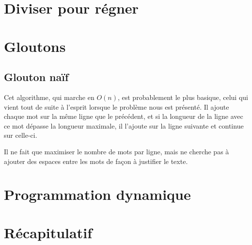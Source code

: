 \documentclass{article}
\begin{document}
\section{Diviser pour régner}

\section{Gloutons}

\subsection{Glouton naïf}

Cet algorithme, qui marche en $O(n)$, est probablement le plus basique, celui
qui vient tout de suite à l'esprit lorsque le problème nous est présenté. Il
ajoute chaque mot sur la même ligne que le précédent, et si la longueur de la
ligne avec ce mot dépasse la longueur maximale, il l'ajoute sur la ligne
suivante et continue sur celle-ci.

Il ne fait que maximiser le nombre de mots par ligne, mais ne cherche pas à
ajouter des espaces entre les mots de façon à justifier le texte.

\section{Programmation dynamique}

\section{Récapitulatif}
\end{document}
